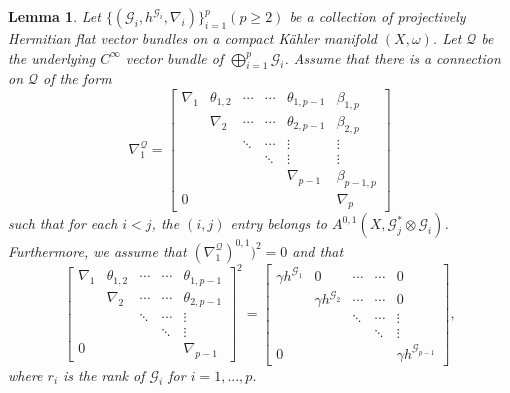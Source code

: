 \documentclass[english,reqno]{amsart}
\newcommand\sG{{\mathscr G}}
\newcommand\sQ{{\mathscr Q}}
\theoremstyle{plain}
\newtheorem{lemma}[thm]{Lemma}
\theoremstyle{definition}
\numberwithin{equation}{section} %
\begin{document}
\begin{lemma}
    \label{lemma:connection-construction}
    Let $\{(\sG_i,h^{\sG_i}, \nabla_i)\}_{i=1}^p (p\geq 2)$  be a collection of projectively Hermitian flat vector bundles on a compact K\"ahler manifold $(X,\omega)$.  Let $\sQ$ be the underlying $C^\infty$ vector bundle of $\bigoplus_{i=1}^p \sG_i$. Assume that there is  a connection  on $\sQ$ of the form
    \[
    \nabla^{\sQ}_1 =
    \begin{bmatrix}
    \nabla_1 & \theta_{1,2} & \cdots & \cdots & \theta_{1,p-1} & \beta_{1,p} \\
    & \nabla_2  & \cdots & \cdots& \theta_{2,p-1} & \beta_{2,p} \\
    & &\ddots & \cdots & \vdots & \vdots \\
    & & & \ddots & \vdots & \vdots \\
    & & & & \nabla_{p-1} & \beta_{p-1,p} \\
    0 & & & & & \nabla_p
    \end{bmatrix}
    \]
    such that  for each $i<j$, the $(i,j)$ entry belongs to  $A^{0,1}(X, \sG_j^*\otimes \sG_i)$.
    Furthermore, we assume that  $(\nabla^{\sQ}_1)^{0,1})^2=0$ and that
    \[
    \begin{bmatrix}
    \nabla_1 & \theta_{1,2} & \cdots & \cdots & \theta_{1,p-1} \\
    &\nabla_2  & \cdots & \cdots& \theta_{2,p-1}  \\
    & & \ddots & \cdots & \vdots  \\
    & & & \ddots & \vdots  \\
    0 & & & & \nabla_{p-1}
    \end{bmatrix}^2
    =
    \begin{bmatrix}
    \gamma h^{\sG_1} &  0 & \cdots & \cdots & 0 \\
    & \gamma h^{\sG_2} & \cdots & \cdots& 0  \\
    & &\ddots & \cdots & \vdots  \\
    & & & \ddots & \vdots  \\
    0 & & & &  \gamma h^{\sG_{p-1}}
    \end{bmatrix},
    \]
    where $r_i$ is the rank of $\sG_i$ for $i=1,...,p.$


\end{lemma}
\end{document}
